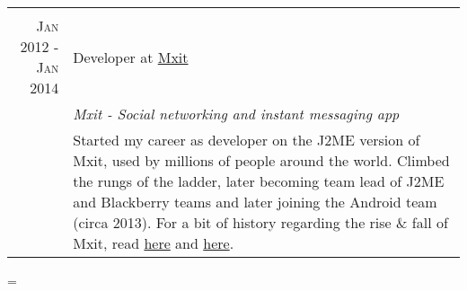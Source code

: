 \documentclass[a4paper,10pt,notitlepage]{article}
\newenvironment{absolutelynopagebreak}
  {\par\nobreak\vfil\penalty0\vfilneg
   \vtop\bgroup}
  {\par\xdef\tpd{\the\prevdepth}\egroup
   \prevdepth=\tpd}
\begin{document}
\begin{absolutelynopagebreak}
\begin{tabular}{r|p{11cm}}
		\multicolumn{2}{c}{} \\
		\textsc{Jan 2012 - Jan 2014} & Developer at \href{www.mxit.com}{Mxit} \\
		                             & \emph{Mxit - Social networking and instant messaging app} \\
		                             & \footnotesize{Started my career as developer on the J2ME version of Mxit, used by millions of people around the world. Climbed the rungs of the ladder, later becoming team lead of J2ME and Blackberry teams and later joining the Android team (circa 2013). For a bit of history regarding the rise \& fall of Mxit, read \href{https://en.wikipedia.org/wiki/Mxit}{here} and \href{https://www.moneyweb.co.za/news/companies-and-deals/how-did-mxit-go-so-wrong/}{here}.} \\
		
	\end{tabular}
	
\end{absolutelynopagebreak}
\end{document}
